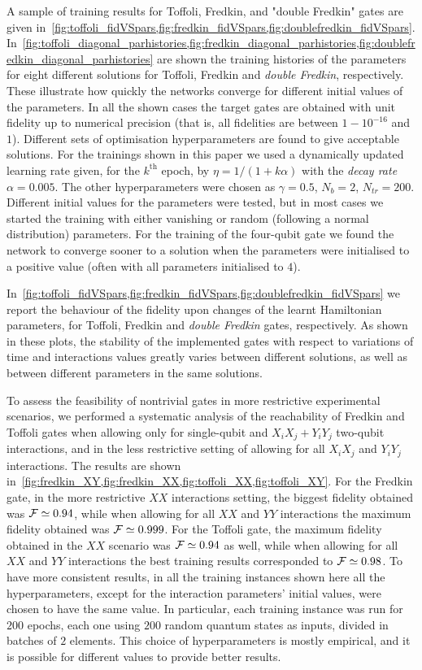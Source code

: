 A sample of training results for Toffoli, Fredkin, and "double Fredkin" gates are given in~\cref{fig:toffoli_fidVSpars,fig:fredkin_fidVSpars,fig:doublefredkin_fidVSpars}.
In~\cref{fig:toffoli_diagonal_parhistories,fig:fredkin_diagonal_parhistories,fig:doublefredkin_diagonal_parhistories} are shown the training histories of the parameters for eight different solutions for Toffoli, Fredkin and \emph{double Fredkin}, respectively.
These illustrate how quickly the networks converge for different initial values of the parameters.
In all the shown cases the target gates are obtained with unit fidelity up to numerical precision (that is, all fidelities are between $1-10^{-16}$ and $1$).
Different sets of optimisation hyperparameters are found to give acceptable solutions.
For the trainings shown in this paper we used a dynamically updated learning rate given, for the $k^{\text{th}}$ epoch, by $\eta=1/(1 + k \alpha)$ with the \emph{decay rate} $\alpha=0.005$.
The other hyperparameters were chosen as
$\gamma=0.5$, 
$N_b = 2$, $N_{tr} = 200$.
Different initial values for the parameters were tested, but in most cases we started the training with either vanishing or random (following a normal distribution) parameters.
For the training of the four-qubit gate we found the network to converge sooner to a solution when the parameters were initialised to a positive value (often with all parameters initialised to $4$).

In~\cref{fig:toffoli_fidVSpars,fig:fredkin_fidVSpars,fig:doublefredkin_fidVSpars} we report the behaviour of the fidelity upon changes of the learnt Hamiltonian parameters, for Toffoli, Fredkin and \emph{double Fredkin} gates, respectively.
As shown in these plots, the stability of the implemented gates with respect to variations of time and interactions values greatly varies between different solutions, as well as between different parameters in the same solutions.

To assess the feasibility of nontrivial gates in more restrictive experimental scenarios, we performed a systematic analysis of the reachability of Fredkin and Toffoli gates when allowing only for single-qubit and $X_i X_j+Y_i Y_j$ two-qubit interactions, and in the less restrictive setting of allowing for all $X_i X_j$ and $Y_i Y_j$ interactions.
The results are shown in~\cref{fig:fredkin_XY,fig:fredkin_XX,fig:toffoli_XX,fig:toffoli_XY}.
For the Fredkin gate, in the more restrictive $XX$ interactions setting, the biggest fidelity obtained was ${\mathcal{F}}\simeq 0.94$, while when allowing for all $XX$ and $YY$ interactions the maximum fidelity obtained was ${\mathcal{F}}\simeq0.999$.
For the Toffoli gate, the maximum fidelity obtained in the $XX$ scenario was ${\mathcal{F}}\simeq0.94$ as well, while when allowing for all $XX$ and $YY$ interactions the best training results corresponded to ${\mathcal{F}}\simeq 0.98$.
To have more consistent results, in all the training instances shown here all the hyperparameters, except for the interaction parameters' initial values, were chosen to have the same value.
In particular, each training instance was run for $200$ epochs, each one using $200$ random quantum states as inputs, divided in batches of $2$ elements.
This choice of hyperparameters is mostly empirical, and it is possible for different values to provide better results.

